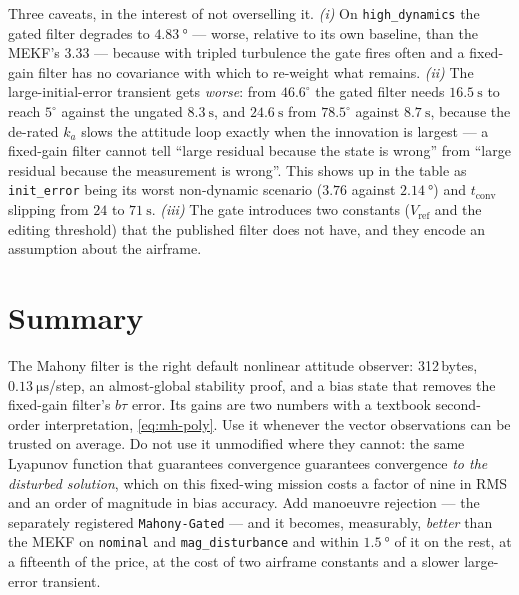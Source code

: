 Three caveats, in the interest of not overselling it. \emph{(i)} On \texttt{high\_dynamics} the gated
filter degrades to $\SI{4.83}{\degree}$ --- worse, relative to its own baseline, than the MEKF's
$3.33$ --- because with tripled turbulence the gate fires often and a fixed-gain filter has no
covariance with which to re-weight what remains. \emph{(ii)} The large-initial-error transient gets
\emph{worse}: from $46.6^\circ$ the gated filter needs $\SI{16.5}{\second}$ to reach $5^\circ$
against the ungated $\SI{8.3}{\second}$, and $\SI{24.6}{\second}$ from $78.5^\circ$ against
$\SI{8.7}{\second}$, because the de-rated $k_a$ slows the attitude loop exactly when the innovation
is largest --- a fixed-gain filter cannot tell ``large residual because the state is wrong'' from
``large residual because the measurement is wrong''. This shows up in the table as
\texttt{init\_error} being its worst non-dynamic scenario ($3.76$ against $\SI{2.14}{\degree}$) and
$t_{\text{conv}}$ slipping from $24$ to $\SI{71}{\second}$. \emph{(iii)} The gate introduces two
constants ($V_{\text{ref}}$ and the editing threshold) that the published filter does not have, and
they encode an assumption about the airframe.

\section{Summary}
The Mahony filter is the right default nonlinear attitude observer: 312\,bytes,
$\SI{0.13}{\micro\second}$/step, an almost-global stability proof, and a bias state that removes the
fixed-gain filter's $b\tau$ error. Its gains are two numbers with a textbook second-order
interpretation, \eqref{eq:mh-poly}. Use it whenever the vector observations can be trusted on
average. Do not use it unmodified where they cannot: the same Lyapunov function that guarantees
convergence guarantees convergence \emph{to the disturbed solution}, which on this fixed-wing
mission costs a factor of nine in RMS and an order of magnitude in bias accuracy. Add manoeuvre
rejection --- the separately registered \texttt{Mahony-Gated} --- and it becomes, measurably,
\emph{better} than the MEKF on \texttt{nominal} and \texttt{mag\_disturbance} and within
$\SI{1.5}{\degree}$ of it on the rest, at a fifteenth of the price, at the cost of
two airframe constants and a slower large-error transient.
